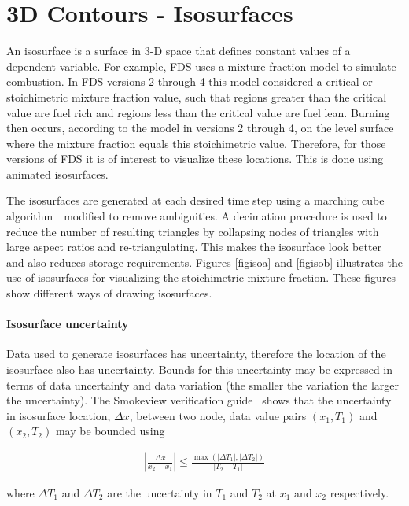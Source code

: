 \documentclass[11pt,twoside]{book}
\begin{document}
\clearpage
\section{3D Contours - Isosurfaces}
An isosurface is a surface in 3-D space that defines constant values of a dependent variable.
For example, FDS uses a mixture fraction model to simulate
combustion. In FDS versions 2 through 4 this model considered a critical or stoichimetric
mixture fraction value, such that regions greater than the
critical value are fuel rich and regions less than the critical
value are fuel lean. Burning then occurs, according to the model in versions 2 through 4,
on the level surface where the mixture fraction equals this
stoichimetric value. Therefore, for those versions of FDS it is of interest to visualize
these locations. This is done using animated isosurfaces.

The isosurfaces are generated at each desired time step using a
marching cube algorithm~\cite{marchingcubes}\ modified to remove
ambiguities. A decimation procedure is used to reduce the number
of resulting triangles by collapsing nodes of triangles with large
aspect ratios and re-triangulating. This makes the isosurface look
better and also reduces storage requirements. Figures \ref{figisoa} and \ref{figisob}
illustrates the use of isosurfaces for visualizing the
stoichimetric mixture fraction. These figures show different ways of drawing isosurfaces.

\paragraph{Isosurface uncertainty} Data used to generate isosurfaces has uncertainty, therefore the location of the isosurface
also has uncertainty.  Bounds for this uncertainty may be expressed in terms of data uncertainty and data variation (the smaller the variation the larger the uncertainty).
The Smokeview verification guide~\cite{Smokeview_Verification_Guide_5} shows that the uncertainty in isosurface location, $\Delta x$, between two node, data value pairs $(x_1,T_1)$ and $(x_2,T_2)$  may be bounded using

\begin{eqnarray*}
\left|\frac{\Delta x}{x_2-x_1}\right|\le
\frac{\max(|\Delta T_1|,|\Delta T_2|)}{|T_2-T_1|}
\end{eqnarray*}

\noindent where $\Delta T_1$ and $\Delta T_2$ are the uncertainty in $T_1$ and $T_2$ at $x_1$ and $x_2$ respectively.
\end{document}
